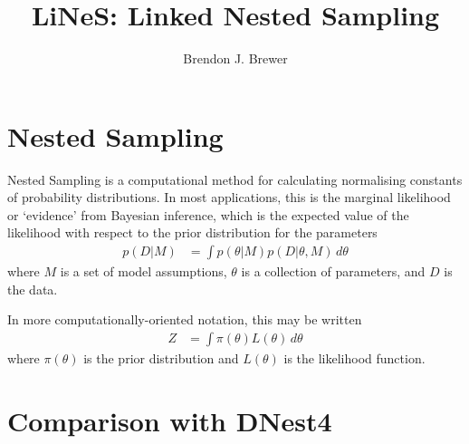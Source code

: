 \documentclass[a4paper, 12pt]{article}
\title{LiNeS: Linked Nested Sampling}
\author{Brendon J. Brewer}
\date{}
\begin{document}
\maketitle


\setlength{\parindent}{0pt}
\setlength{\parskip}{8pt}

\section{Nested Sampling}
Nested Sampling \citep{skilling2006nested}
is a computational method for calculating normalising
constants of probability distributions. In most applications, this is
the marginal likelihood or `evidence' from Bayesian inference, which is
the expected value of the likelihood with respect to the prior distribution
for the parameters
\begin{align}
p(D | M) &= \int p(\theta | M) p(D | \theta, M) \, d\theta
\end{align}
where $M$ is a set of model assumptions, $\theta$ is a collection of
parameters, and $D$ is the data.

In more computationally-oriented notation, this may be written
\begin{align}
Z &= \int \pi(\theta)L(\theta) \, d\theta
\end{align}
where $\pi(\theta)$ is the prior distribution and $L(\theta)$ is the
likelihood function.




\section{Comparison with DNest4}
\end{document}
